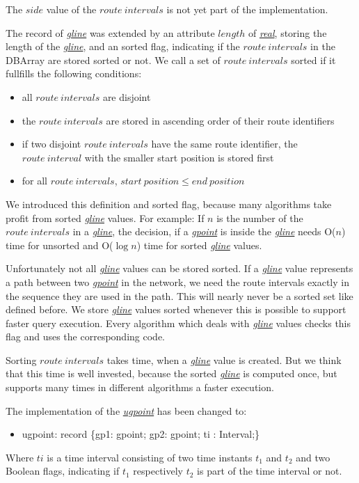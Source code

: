 \documentclass[a4paper]{article}
\newcommand{\dt}[1]{\textsl{\underline{#1}}}
\begin{document}
The $side$ value of the $route\ intervals$ is not yet part of the implementation.

\label{sec:sortedgline}
The record of \dt{gline} was extended by an attribute $length$ of
\dt{real}, storing the length of the \dt{gline}, and an sorted flag, indicating
if the $route\ intervals$ in the DBArray are stored sorted or not. We call a
set of $route\ intervals$ sorted if it fullfills the following conditions:
\begin{itemize}
   \item all $route\ intervals$ are disjoint
   \item the $route\ intervals$ are stored in ascending order of their route identifiers
   \item if two disjoint $route\ intervals$ have the same route identifier, the
$route\ interval$ with the smaller start position is stored first
   \item for all $route\ intervals$, $start\ position \le end\ position$
\end{itemize}
We introduced this definition and sorted flag, because many algorithms take profit
from sorted \dt{gline} values. For example: If $n$ is the number of the
$route\ intervals$ in a \dt{gline}, the decision, if a \dt{gpoint} is inside
the \dt{gline} needs O($n$) time for unsorted and O($\log n$) time for sorted
\dt{gline} values.

Unfortunately not all \dt{gline} values can be stored sorted. If a \dt{gline}
value represents a path between two \dt{gpoint} in the network, we need the
route intervals exactly in the sequence they are used in the path. This will
nearly never be a sorted set like defined before.  We store \dt{gline}
values sorted whenever this is possible to support faster query execution.
Every algorithm which deals with \dt{gline} values checks this flag and uses
the corresponding code.

Sorting $route\ intervals$ takes time, when a \dt{gline} value is created. But
we think that this time is well invested, because the sorted \dt{gline} is computed
once, but supports many times in different algorithms a faster execution.

The implementation of the \dt{ugpoint} has been changed to:
\begin{ttfamily}
\begin{itemize}
  \item [] ugpoint: record \{gp1: gpoint; gp2: gpoint; ti : Interval;\}
\end{itemize}
\end{ttfamily}
Where $ti$ is a time interval consisting of two time instants $t_1$ and $t_2$
and
two Boolean flags, indicating if $t_1$ respectively $t_2$ is part of the time
interval
or not.
\end{document}
